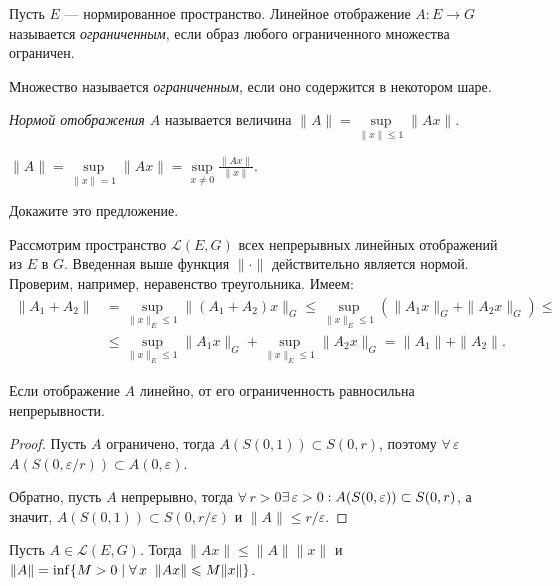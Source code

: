 \documentclass[10pt,titlepage, a4paper]{article}
\begin{document}
\lecture

\begin{defen}
Пусть $E$ --- нормированное пространство. Линейное отображение
$A\colon E\to G$ называется \emph{ограниченным}, если образ любого
ограниченного множества ограничен.

Множество называется \emph{ограниченным}, если оно содержится в
некотором шаре.

\emph{Нормой отображения $A$} называется величина
$\|A\|=\sup\limits_{\|x\|\leqslant 1}\|Ax\|$.
\end{defen}

\begin{predl}
$\|A\|=\sup\limits_{\|x\|=1}\|Ax\|=\sup\limits_{x\neq
0}\frac{\|Ax\|}{\|x\|}$.
\end{predl}

\begin{upr}
Докажите это предложение.
\end{upr}

Рассмотрим пространство $\mathcal{L}(E,G)$ всех непрерывных линейных
отображений из $E$ в $G$. Введенная выше функция $\|\cdot\|$
действительно является нормой. Проверим, например, неравенство
треугольника. Имеем:
\begin{align*}
\|A_1+A_2\|&=\sup\limits_{\|x\|_E\leqslant 1}\|(A_1+A_2)x\|_G
\leqslant \sup\limits_{\|x\|_E\leqslant
1}(\|A_1x\|_G+\|A_2x\|_G)\leqslant
\\&\leqslant\sup\limits_{\|x\|_E\leqslant
1}\|A_1x\|_G+\sup\limits_{\|x\|_E\leqslant
1}\|A_2x\|_G=\|A_1\|+\|A_2\|.
\end{align*}

\begin{predl}
Если отображение $A$ линейно, от его ограниченность равносильна
непрерывности.
\end{predl}

\begin{proof}
Пусть $A$ ограничено, тогда $A(S(0,1))\subset S(0,r)$, поэтому
$\forall\,\varepsilon$\;\;$A(S(0,\varepsilon/r))\subset
A(0,\varepsilon)$.

Обратно, пусть $A$ непрерывно, тогда
$\forall\,r>0$\;\;$\exists\,\varepsilon
>0:A(S(0,\varepsilon))\p\subset S(0,r)$, а значит, $A(S(0,1))\subset
S(0,r/\varepsilon)$ и $\|A\|\leqslant r/\varepsilon$.
\end{proof}

\begin{predl}
Пусть $A\in\mathcal{L}(E,G)$. Тогда $\|Ax\|\leqslant \|A\|\|x\|$ и
$\|A\|\p=\inf\{M>0\mid \forall\,x\;\;\|Ax\|\leqslant M\|x\|\}$.
\end{predl}
\end{document}
